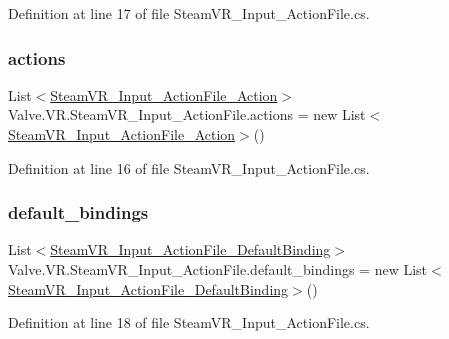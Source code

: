 Definition at line 17 of file Steam\+V\+R\+\_\+\+Input\+\_\+\+Action\+File.\+cs.

\mbox{\label{class_valve_1_1_v_r_1_1_steam_v_r___input___action_file_ab324306dc9516ec2306947a22a2adcba}} 
\subsubsection{\texorpdfstring{actions}{actions}}
{\footnotesize\ttfamily List$<$\mbox{\hyperlink{class_valve_1_1_v_r_1_1_steam_v_r___input___action_file___action}{Steam\+V\+R\+\_\+\+Input\+\_\+\+Action\+File\+\_\+\+Action}}$>$ Valve.\+V\+R.\+Steam\+V\+R\+\_\+\+Input\+\_\+\+Action\+File.\+actions = new List$<$\mbox{\hyperlink{class_valve_1_1_v_r_1_1_steam_v_r___input___action_file___action}{Steam\+V\+R\+\_\+\+Input\+\_\+\+Action\+File\+\_\+\+Action}}$>$()}



Definition at line 16 of file Steam\+V\+R\+\_\+\+Input\+\_\+\+Action\+File.\+cs.

\mbox{\label{class_valve_1_1_v_r_1_1_steam_v_r___input___action_file_ab24430cccd335b4f5e5d37b39d70cb86}} 
\subsubsection{\texorpdfstring{default\_bindings}{default\_bindings}}
{\footnotesize\ttfamily List$<$\mbox{\hyperlink{class_valve_1_1_v_r_1_1_steam_v_r___input___action_file___default_binding}{Steam\+V\+R\+\_\+\+Input\+\_\+\+Action\+File\+\_\+\+Default\+Binding}}$>$ Valve.\+V\+R.\+Steam\+V\+R\+\_\+\+Input\+\_\+\+Action\+File.\+default\+\_\+bindings = new List$<$\mbox{\hyperlink{class_valve_1_1_v_r_1_1_steam_v_r___input___action_file___default_binding}{Steam\+V\+R\+\_\+\+Input\+\_\+\+Action\+File\+\_\+\+Default\+Binding}}$>$()}



Definition at line 18 of file Steam\+V\+R\+\_\+\+Input\+\_\+\+Action\+File.\+cs.

